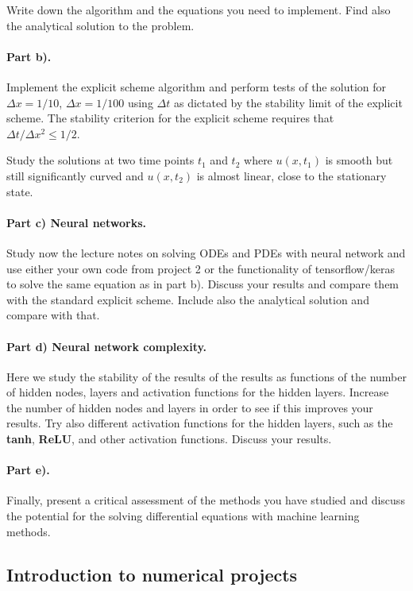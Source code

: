 \documentclass[%
oneside,                 %
final,                   %
10pt]{article}
\begin{document}
Write down the algorithm and the equations you need to implement.
Find also the analytical solution to the problem. 

\paragraph{Part b).}
Implement the explicit scheme  algorithm and perform tests of the solution 
for $\Delta x=1/10$, $\Delta x=1/100$ using  $\Delta t$ as dictated by the stability limit of the explicit scheme. The stability criterion for the explicit scheme requires that $\Delta t/\Delta x^2 \leq 1/2$. 

Study the solutions at two time points $t_1$ and $t_2$ where $u(x,t_1)$ is smooth but still significantly curved
and $u(x,t_2)$ is almost linear, close to the stationary state.

\paragraph{Part c) Neural networks.}
Study now the lecture notes on solving ODEs and PDEs with neural
network and use either your own code from project 2 or the
functionality of tensorflow/keras to solve the same equation as in
part b).  Discuss your results and compare them with the standard
explicit scheme. Include also the analytical solution and compare with
that.

\paragraph{Part d) Neural network complexity.}
Here we study the stability of the results of the results as functions of the number of hidden nodes, layers and activation functions for the hidden layers.
Increase the number of hidden nodes and layers in order to see if this improves your results. Try also different activation functions for the hidden layers, such as the \textbf{tanh}, \textbf{ReLU}, and other activation functions. 
Discuss your results.

\paragraph{Part e).}
Finally, present a critical assessment of the methods you have studied
and discuss the potential for the solving differential equations with machine learning methods.

\subsection{Introduction to numerical projects}
\end{document}
